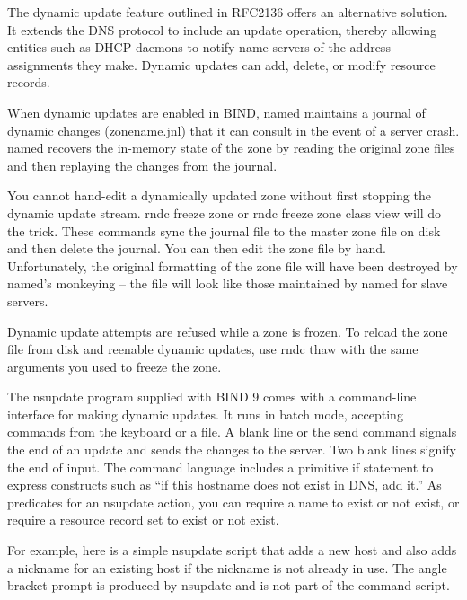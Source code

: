 The dynamic update feature outlined in RFC2136 offers an alternative
solution. It extends the DNS protocol to include an update operation,
thereby allowing entities such as DHCP daemons to notify name servers of
the address assignments they make. Dynamic updates can add, delete, or
modify resource records.

When dynamic updates are enabled in BIND, {named} maintains a journal of
dynamic changes ({zonename}{.jnl}) that it can consult in the event of a
server crash. {named }recovers the in-memory state of the zone by
reading the original zone files and then replaying the changes from the
journal.

You cannot hand-edit a dynamically updated zone without first stopping
the dynamic update stream.
\protect\hypertarget{part0024_split_052.htmlux5cux23_idIndexMarker2227}{}{}\protect\hypertarget{part0024_split_052.htmlux5cux23_idIndexMarker2228}{}{}{rndc
freeze }{zone}{ }or{ rndc freeze }{zone class view}{ }will do the trick.
These commands sync the journal file to the master zone file on disk and
then delete the journal. You can then edit the zone file by hand.
Unfortunately, the original formatting of the zone file will have been
destroyed by {named}'s monkeying -- the file will look like those
maintained by {named} for slave servers.

Dynamic update attempts are refused while a zone is frozen. To reload
the zone file from disk and reenable dynamic updates, use {rndc thaw}
with the same arguments you used to freeze the zone.

The
\protect\hypertarget{part0024_split_052.htmlux5cux23_idIndexMarker2229}{}{}{nsupdate}
program supplied with BIND 9 comes with a command-line interface for
making dynamic updates. It runs in batch mode, accepting commands from
the keyboard or a file. A blank line or the {send} command signals the
end of an update and sends the changes to the server. Two blank lines
signify the end of input. The command language includes a primitive if
statement to express constructs such as ``if this hostname does not
exist in DNS, add it.'' As predicates for an {nsupdate} action, you can
require a name to exist or not exist, or require a resource record set
to exist or not exist.

For example, here is a simple {nsupdate} script that adds a new host and
also adds a nickname for an existing host if the nickname is not already
in use. The angle bracket prompt is produced by {nsupdate} and is not
part of the command script.

